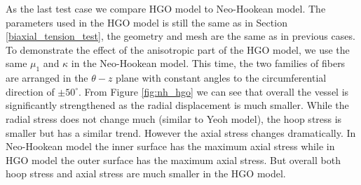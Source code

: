 As the last test case we compare HGO model to Neo-Hookean model. The parameters used in the HGO model is still the same as in Section \ref{biaxial_tension_test}, the geometry and mesh are the same as in previous cases. To demonstrate the effect of the anisotropic part of the HGO model, we use the same $\mu_1$ and $\kappa$ in the Neo-Hookean model. This time, the two families of fibers are arranged in the $\theta-z$ plane with constant angles to the circumferential direction of $\pm 50^\circ$. From Figure \ref{fig:nh_hgo} we can see that overall the vessel is significantly strengthened as the radial displacement is much smaller. While the radial stress does not change much (similar to Yeoh model), the hoop stress is smaller but has a similar trend. However the axial stress changes dramatically. In Neo-Hookean model the inner surface has the maximum axial stress while in HGO model the outer surface has the maximum axial stress. But overall both hoop stress and axial stress are much smaller in the HGO model.

